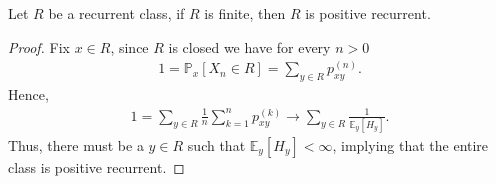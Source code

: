\begin{prop}[]
	Let $R$ be a recurrent class, if $R$ is finite, then $R$ is positive recurrent.
\end{prop}
\begin{proof}
	Fix $x\in R$, since $R$ is closed we have for every $n> 0$
	\begin{align}
		1 = \mathbb{P}_{x} \left[ X_n \in R \right] = \sum_{y\in R}^{} p_{xy}^{(n)}.
	\end{align}
Hence, 
\begin{align}
	1 = \sum_{y\in R}^{} \frac{1}{n} \sum_{k=1}^{n} p_{xy}^{(k)} \to \sum_{y \in R}^{} \frac{1}{\mathbb{E}_{y} \left[ H_y \right] }.
\end{align}
Thus, there must be a $y\in R$ such that $\mathbb{E}_{y} \left[ H_y \right] < \infty $, implying that the entire class is positive recurrent.
\end{proof}


